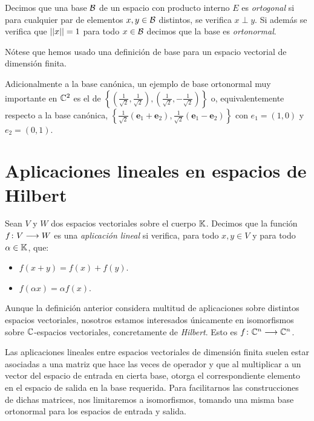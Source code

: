 \begin{definition} Decimos que una base $\mathcal{B}$ de un espacio con producto interno $E$ es \textit{ortogonal} si para cualquier par de elementos $x,y\in\mathcal{B}$ distintos, se verifica $x\perp y$. Si además se verifica que $\left|\left|x\right|\right|=1$ para todo $x\in\mathcal{B}$ decimos que la base es \textit{ortonormal}.

Nótese que hemos usado una definición de base para un espacio vectorial de dimensión finita.
\end{definition}

\begin{example} \label{ex:ex34} Adicionalmente a la base canónica, un ejemplo de base ortonormal muy importante en $\mathbb{C}^2$ es el de $\left\{\left(\frac{1}{\sqrt{2}},\frac{1}{\sqrt{2}}\right),\left(\frac{1}{\sqrt{2}},-\frac{1}{\sqrt{2}}\right)\right\}$ o, equivalentemente respecto a la base canónica, $\left\{\frac{1}{\sqrt{2}}\left(\textbf{e}_1 + \textbf{e}_2\right),\frac{1}{\sqrt{2}}\left(\textbf{e}_1 - \textbf{e}_2\right)\right\}$ con $e_1=(1,0)$ y $e_2=(0,1)$.
\end{example}

\section{Aplicaciones lineales en espacios de Hilbert}

\begin{definition} Sean $V$ y $W$ dos espacios vectoriales sobre el cuerpo $\mathbb{K}$. Decimos que la función $f\colon V\longrightarrow W$ es una \textit{aplicación lineal} si verifica, para todo $x,y\in V$ y para todo $\alpha\in\mathbb{K}$, que:
\begin{itemize}
\item $f(x+y)=f(x)+f(y)$.
\item $f(\alpha x)=\alpha f(x)$.
\end{itemize}
\end{definition}

Aunque la definición anterior considera multitud de aplicaciones sobre distintos espacios vectoriales, nosotros estamos interesados únicamente en isomorfismos sobre $\mathbb{C}$-espacios vectoriales, concretamente de \textit{Hilbert}. Esto es $f\colon \mathbb{C}^n\longrightarrow \mathbb{C}^n$.

Las aplicaciones lineales entre espacios vectoriales de dimensión finita suelen estar asociadas a una matriz que hace las veces de operador y que al multiplicar a un vector del espacio de entrada en cierta base, otorga el correspondiente elemento en el espacio de salida en la base requerida. Para facilitarnos las construcciones de dichas matrices, nos limitaremos a isomorfismos, tomando una misma base ortonormal para los espacios de entrada y salida.

